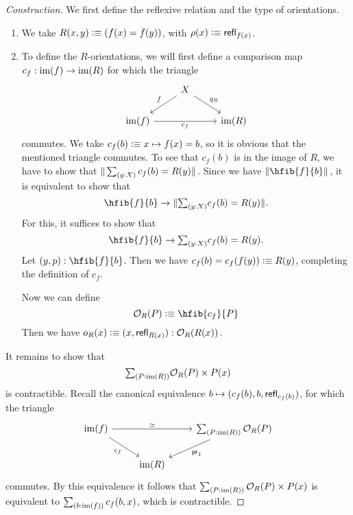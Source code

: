 \begin{proof}[Construction]
We first define the reflexive relation and the type of orientations.
\begin{enumerate}
\item We take $R(x,y)\vcentcolon\equiv (f(x)=f(y))$, with $\rho(x)\vcentcolon\equiv \mathsf{refl}_{f(x)}$. 
\item To define the $R$-orientations, we will first define a comparison map $c_f : \operatorname{im}(f)\to\operatorname{im}(R)$ for which the triangle
\begin{equation}\label{eq:intro_cf}
\begin{tikzcd}
& X \arrow[dl,swap,"f"] \arrow[dr,"q_R"] \\
\im(f) \arrow[rr,swap,"c_f"] & & \im(R)
\end{tikzcd}
\end{equation}
commutes. We take $c_f(b)\vcentcolon\equiv x\mapsto f(x)=b$, so it is obvious that the mentioned triangle commutes. To see that $c_f(b)$ is in the image of $R$, we have to show that $\brck{\sm{y:X} c_f(b)=R(y)}$. Since we have $\brck{\hfib{f}{b}}$, it is equivalent to show that
\begin{equation*}
\hfib{f}{b}\to\brck{\sm{y:X}c_f(b)=R(y)}.
\end{equation*}
For this, it suffices to show that
\begin{equation*}
\hfib{f}{b}\to\sm{y:X}c_f(b)=R(y).
\end{equation*}
Let $\pairr{y,p}:\hfib{f}{b}$. Then we have $c_f(b)=c_f(f(y))\vcentcolon\equiv R(y)$, completing the definition of $c_f$. 

Now we can define 
\begin{equation*}
\mathcal{O}_R(P)\defeq \hfib{c_f}{P}
\end{equation*}
Then we have $o_R(x)\vcentcolon\equiv {\mathopen{}(x,\mathsf{refl}_{R(x)})\mathclose{}}:\mathcal{O}_R(R(x))$. 
\end{enumerate}
It remains to show that
\begin{equation*}
\sm{P:\im(R)}\mathcal{O}_R(P)\times P(x)
\end{equation*}
is contractible. Recall the canonical equivalence $b\mapsto{\mathopen{}(c_f(b),b,\mathsf{refl}_{c_f(b)})\mathclose{}}$, for which the triangle
\begin{equation*}
\begin{tikzcd}
\im(f) \arrow[dr,swap,"c_f"] \arrow[rr,"\eqvsym"] & & \sm{P:\im(R)}\mathcal{O}_R(P) \arrow[dl,"\proj1"] \\
& \im(R)
\end{tikzcd}
\end{equation*}
commutes. By this equivalence it follows that $\sm{P:\im(R)}\mathcal{O}_R(P)\times P(x)$ is equivalent to $\sm{b:\im(f)}c_f(b,x)$, which is contractible.
\end{proof}

